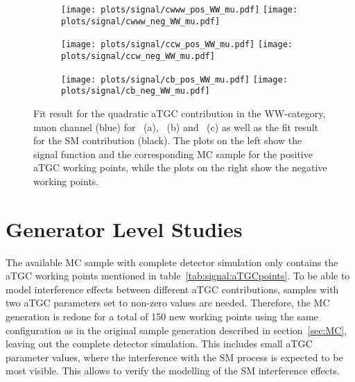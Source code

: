 \begin{figure}
	\centering
	\begin{subfigure}{\textwidth}
		\texttt{[image: plots/signal/cwww\_pos\_WW\_mu.pdf]}
		\texttt{[image: plots/signal/cwww\_neg\_WW\_mu.pdf]}
		\caption{}
	\end{subfigure}
	\begin{subfigure}{\textwidth}
		\texttt{[image: plots/signal/ccw\_pos\_WW\_mu.pdf]}
		\texttt{[image: plots/signal/ccw\_neg\_WW\_mu.pdf]}
		\caption{}
	\end{subfigure}
	\begin{subfigure}{\textwidth}
		\texttt{[image: plots/signal/cb\_pos\_WW\_mu.pdf]}
		\texttt{[image: plots/signal/cb\_neg\_WW\_mu.pdf]}
		\caption{}
	\end{subfigure}
	\caption[Fit result for the quadratic aTGC contribution in the WW-category, muon channel]{Fit result for the quadratic aTGC contribution in the WW-category, muon channel (blue) for \Tcwww \ (a), \Tccw \ (b) and \Tcb \ (c) as well as the fit result for the SM contribution (black). The plots on the left show the signal function and the corresponding MC sample for the positive aTGC working points, while the plots on the right show the negative working points.}
	\label{fig:signal:WW_mu_sig}
\end{figure}


\section{Generator Level Studies}
The available MC sample with complete detector simulation only contains the aTGC working points mentioned in table~\ref{tab:signal:aTGCpoints}. To be able to model interference effects between different aTGC contributions, samples with two aTGC parameters set to non-zero values are needed. Therefore, the MC generation is redone for a total of 150 new working points using the same configuration as in the original sample generation described in section~\ref{sec:MC}, leaving out the complete detector simulation. This includes small aTGC parameter values, where the interference with the SM process is expected to be most visible. This allows to verify the modelling of the SM interference effects.\\

